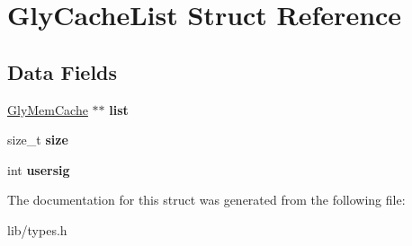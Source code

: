 \hypertarget{structGlyCacheList}{
\section{GlyCacheList Struct Reference}
\label{structGlyCacheList}
}
\subsection*{Data Fields}
\begin{DoxyCompactItemize}
\item 
\hypertarget{structGlyCacheList_a6e92eb6763ee44c70cb956e2174fd2f3}{
\hyperlink{structGlyMemCache}{GlyMemCache} $\ast$$\ast$ {\bfseries list}}
\label{structGlyCacheList_a6e92eb6763ee44c70cb956e2174fd2f3}

\item 
\hypertarget{structGlyCacheList_a7bce6cb9df4020c98c0c5ff39fd5e0bd}{
size\_\-t {\bfseries size}}
\label{structGlyCacheList_a7bce6cb9df4020c98c0c5ff39fd5e0bd}

\item 
\hypertarget{structGlyCacheList_a609c068c73bc9f78609277c0ebe1a18d}{
int {\bfseries usersig}}
\label{structGlyCacheList_a609c068c73bc9f78609277c0ebe1a18d}

\end{DoxyCompactItemize}


The documentation for this struct was generated from the following file:\begin{DoxyCompactItemize}
\item 
lib/types.h\end{DoxyCompactItemize}
